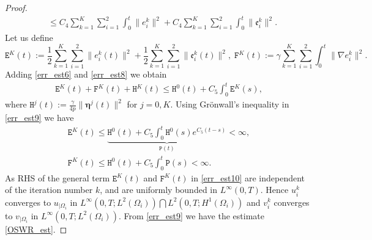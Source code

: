 \documentclass[10pt,a4paper]{amsart}
\begin{document}
\begin{proof}
\begin{equation}
\begin{aligned}
& \leq C_4 \sum_{k=1}^K\sum_{i=1}^2\int_0^t\parallel e_i^{k}\parallel^2 + C_4 \sum_{k=1}^K\sum_{i=1}^2\int_0^t\parallel \mathfrak{e}_i^{k}\parallel^2.
\end{aligned}
\end{equation} 
Let us define 
\begin{equation}
\mathtt{E}^{K}(t):= \frac{1}{2}\sum_{k=1}^K\sum_{i=1}^2\parallel {e}_i^{k}(t)\parallel^2 + \frac{1}{2}\sum_{k=1}^K\sum_{i=1}^2\parallel \mathfrak{e}_i^{k}(t)\parallel^2, \; \mathtt{F}^{K}(t):= \gamma\sum_{k=1}^K\sum_{i=1}^2\int_0^t \parallel\nabla e_i^{k} \parallel^2.
\end{equation}
Adding \eqref{err_est6} and \eqref{err_est8} we obtain 
\begin{equation}\label{err_est9}
\begin{aligned}
\mathtt{E}^{K}(t)+ \mathtt{F}^{K}(t) +\mathtt{H}^{K}(t)
 \leq \mathtt{H}^{0}(t)+ C_5\int_0^t\mathtt{E}^{K}(s),
\end{aligned}
\end{equation} 
where $\mathtt{H}^{j}(t):=\frac{\gamma}{4p} \parallel\boldsymbol{\eta}^{j}(t)\parallel^2$ for $j=0, K$. 
Using Gr\"{o}nwall's inequality in \eqref{err_est9} we have
\begin{equation}\label{err_est10}
\begin{aligned}
\mathtt{E}^{K}(t) \leq \underbrace{\mathtt{H}^{0}(t) + C_5\int_0^t \mathtt{H}^{0}(s) e^{C_5 (t-s)}}_{\mathtt{P}(t)} <\infty, \\
\mathtt{F}^{K}(t) \leq \mathtt{H}^{0}(t) +C_5\int_0^t \mathtt{P}(s)<\infty.
\end{aligned}
\end{equation}
As RHS of the general term $\mathtt{E}^{K}(t)$ and $\mathtt{F}^{K}(t)$ in \eqref{err_est10} are independent of the iteration number $k$, %
and are uniformly bounded in $L^{\infty}(0,T)$. Hence $u_i^{k}$ converges to $u_{|\Omega_i}$ in 
$L^{\infty}(0,T;L^2(\Omega_i))\bigcap L^2(0,T;H^1(\Omega_i))$ and $v_i^{k}$ converges to $v_{|\Omega_i}$ in 
$L^{\infty}(0,T;L^2(\Omega_i))$. From \eqref{err_est9} we have the estimate \eqref{OSWR_est}.
\end{proof}
\end{document}
